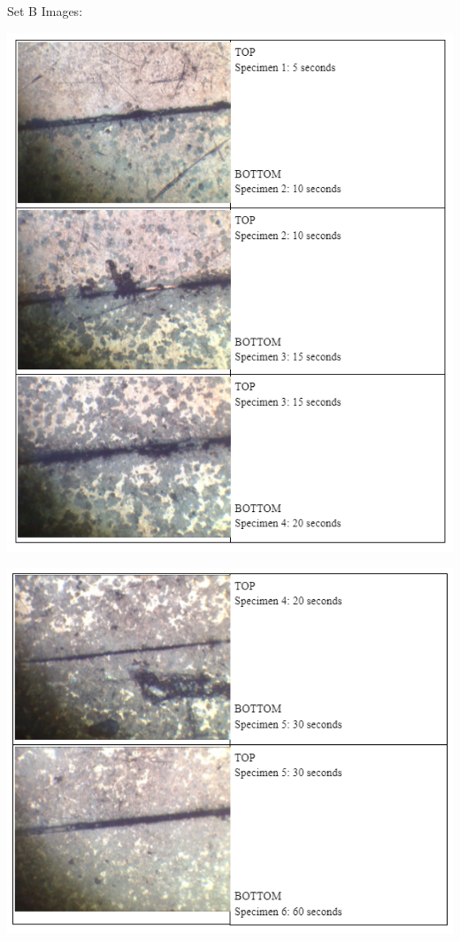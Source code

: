 \documentclass{article}
\begin{document}
\newpage 
Set B Images:
\begin{center}
\includegraphics[width=400pt]{10.png}
\end{center}

\begin{center}
\includegraphics[width=400pt]{11.png}
\end{center}
\end{document}
